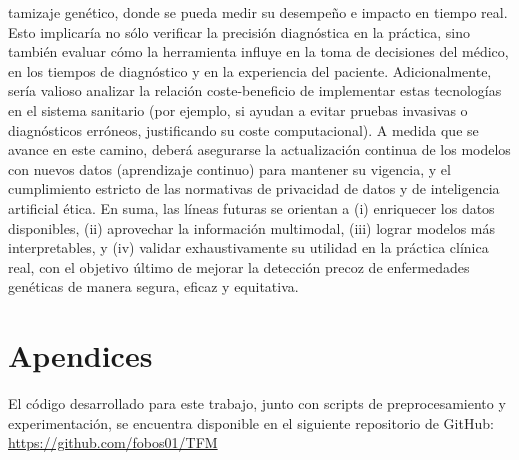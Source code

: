 \documentclass[11pt,a4paper,spanish]{book}
\numberwithin{equation}{chapter}
\numberwithin{figure}{chapter}
\begin{document}
tamizaje genético, donde se pueda medir su desempeño e impacto en tiempo real. Esto implicaría no sólo verificar la precisión diagnóstica en la práctica, sino también evaluar cómo la herramienta influye en la toma de decisiones del médico, en los tiempos de diagnóstico y en la experiencia del paciente. Adicionalmente, sería valioso analizar la relación coste-beneficio de implementar estas tecnologías en el sistema sanitario (por ejemplo, si ayudan a evitar pruebas invasivas o diagnósticos erróneos, justificando su coste computacional). A medida que se avance en este camino, deberá asegurarse la actualización continua de los modelos con nuevos datos (aprendizaje continuo) para mantener su vigencia, y el cumplimiento estricto de las normativas de privacidad de datos y de inteligencia artificial ética. En suma, las líneas futuras se orientan a (i) enriquecer los datos disponibles, (ii) aprovechar la información multimodal, (iii) lograr modelos más interpretables, y (iv) validar exhaustivamente su utilidad en la práctica clínica real, con el objetivo último de mejorar la detección precoz de enfermedades genéticas de manera segura, eficaz y equitativa.





\appendix
\chapter{Apendices}

El código desarrollado para este trabajo, junto con scripts de preprocesamiento y experimentación, se encuentra disponible en el siguiente repositorio de GitHub: \\
\url{https://github.com/fobos01/TFM}
\end{document}
